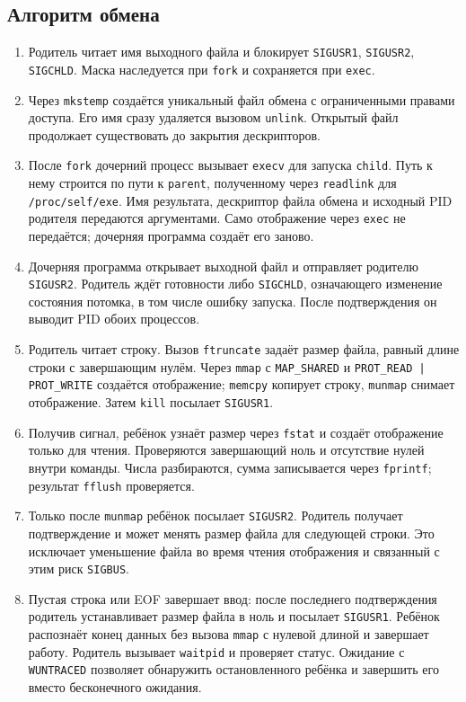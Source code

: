 \documentclass[12pt,a4paper]{article}
\begin{document}
\subsection{Алгоритм обмена}
\begin{enumerate}
\item Родитель читает имя выходного файла и блокирует \texttt{SIGUSR1}, \texttt{SIGUSR2}, \texttt{SIGCHLD}. Маска наследуется при \texttt{fork} и сохраняется при \texttt{exec}.
\item Через \texttt{mkstemp} создаётся уникальный файл обмена с ограниченными правами доступа. Его имя сразу удаляется вызовом \texttt{unlink}. Открытый файл продолжает существовать до закрытия дескрипторов.
\item После \texttt{fork} дочерний процесс вызывает \texttt{execv} для запуска \texttt{child}. Путь к нему строится по пути к \texttt{parent}, полученному через \texttt{readlink} для \texttt{/proc/self/exe}. Имя результата, дескриптор файла обмена и исходный PID родителя передаются аргументами. Само отображение через \texttt{exec} не передаётся; дочерняя программа создаёт его заново.
\item Дочерняя программа открывает выходной файл и отправляет родителю \texttt{SIGUSR2}. Родитель ждёт готовности либо \texttt{SIGCHLD}, означающего изменение состояния потомка, в том числе ошибку запуска. После подтверждения он выводит PID обоих процессов.
\item Родитель читает строку. Вызов \texttt{ftruncate} задаёт размер файла, равный длине строки с завершающим нулём. Через \texttt{mmap} с \texttt{MAP\_SHARED} и \texttt{PROT\_READ | PROT\_WRITE} создаётся отображение; \texttt{memcpy} копирует строку, \texttt{munmap} снимает отображение. Затем \texttt{kill} посылает \texttt{SIGUSR1}.
\item Получив сигнал, ребёнок узнаёт размер через \texttt{fstat} и создаёт отображение только для чтения. Проверяются завершающий ноль и отсутствие нулей внутри команды. Числа разбираются, сумма записывается через \texttt{fprintf}; результат \texttt{fflush} проверяется.
\item Только после \texttt{munmap} ребёнок посылает \texttt{SIGUSR2}. Родитель получает подтверждение и может менять размер файла для следующей строки. Это исключает уменьшение файла во время чтения отображения и связанный с этим риск \texttt{SIGBUS}.
\item Пустая строка или EOF завершает ввод: после последнего подтверждения родитель устанавливает размер файла в ноль и посылает \texttt{SIGUSR1}. Ребёнок распознаёт конец данных без вызова \texttt{mmap} с нулевой длиной и завершает работу. Родитель вызывает \texttt{waitpid} и проверяет статус. Ожидание с \texttt{WUNTRACED} позволяет обнаружить остановленного ребёнка и завершить его вместо бесконечного ожидания.
\end{enumerate}
\end{document}
